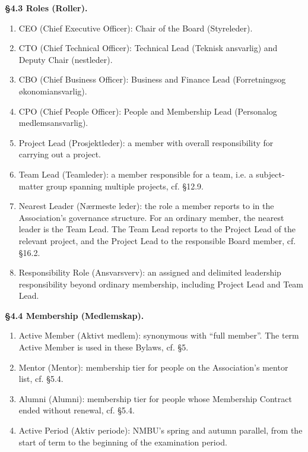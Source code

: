 \documentclass{../../../Common/Latex/Templates/rapport}
\begin{document}
\textbf{\S 4.3 Roles (Roller).}
\begin{enumerate}
  \item CEO (Chief Executive Officer): Chair of the Board (Styreleder).
  \item CTO (Chief Technical Officer): Technical Lead (Teknisk ansvarlig) and Deputy Chair (nestleder).
  \item CBO (Chief Business Officer): Business and Finance Lead (Forretningsog økonomiansvarlig).
  \item CPO (Chief People Officer): People and Membership Lead (Personalog medlemsansvarlig).
  \item Project Lead (Prosjektleder): a member with overall responsibility for carrying out a project.
  \item Team Lead (Teamleder): a member responsible for a team, i.e. a subject-matter group spanning multiple projects, cf. \S12.9.
  \item Nearest Leader (Nærmeste leder): the role a member reports to in the Association's governance structure. For an ordinary member, the nearest leader is the Team Lead. The Team Lead reports to the Project Lead of the relevant project, and the Project Lead to the responsible Board member, cf. \S16.2.
  \item Responsibility Role (Ansvarsverv): an assigned and delimited leadership responsibility beyond ordinary membership, including Project Lead and Team Lead.
\end{enumerate}

\textbf{\S 4.4 Membership (Medlemskap).}
\begin{enumerate}
  \item Active Member (Aktivt medlem): synonymous with ``full member''. The term Active Member is used in these Bylaws, cf. \S5.
  \item Mentor (Mentor): membership tier for people on the Association's mentor list, cf. \S5.4.
  \item Alumni (Alumni): membership tier for people whose Membership Contract ended without renewal, cf. \S5.4.
  \item Active Period (Aktiv periode): NMBU's spring and autumn parallel, from the start of term to the beginning of the examination period.
\end{enumerate}
\end{document}
